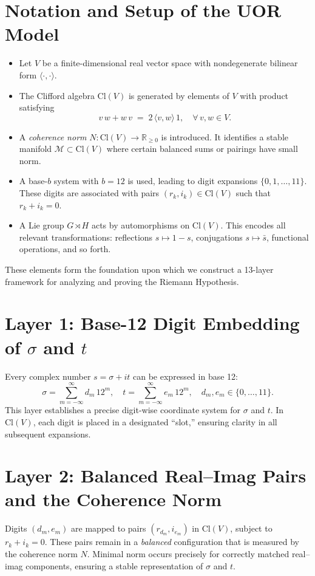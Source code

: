 \documentclass[11pt]{article}
\begin{document}
\section{Notation and Setup of the UOR Model}
\label{sec:notation-setup}
\begin{itemize}
\item Let \(V\) be a finite-dimensional real vector space with nondegenerate bilinear form \(\langle\cdot,\cdot\rangle\).  
\item The Clifford algebra \(\mathrm{Cl}(V)\) is generated by elements of \(V\) with product satisfying 
\[
  v\,w + w\,v \;=\; 2\,\langle v,w\rangle \,1, \quad \forall\,v,w\in V.
\]
\item A \emph{coherence norm} \(N\colon \mathrm{Cl}(V)\to \mathbb{R}_{\ge0}\) is introduced. It identifies a stable manifold \(\mathcal{M}\subset \mathrm{Cl}(V)\) where certain balanced sums or pairings have small norm.
\item A base-\(b\) system with \(b=12\) is used, leading to digit expansions \(\{0,1,\dots,11\}\). These digits are associated with pairs \((r_k, i_k)\in \mathrm{Cl}(V)\) such that \(r_k + i_k=0\). 
\item A Lie group \(G\rtimes H\) acts by automorphisms on \(\mathrm{Cl}(V)\). This encodes all relevant transformations: reflections \(s\mapsto 1-s\), conjugations \(s\mapsto \bar{s}\), functional operations, and so forth.  
\end{itemize}

These elements form the foundation upon which we construct a 13-layer framework for analyzing and proving the Riemann Hypothesis.

\section{Layer 1: Base-12 Digit Embedding of \(\sigma\) and \(t\)}
Every complex number \(s=\sigma+it\) can be expressed in base 12:
\[
  \sigma = \sum_{m=-\infty}^{\infty} d_m \, 12^m, 
  \quad
  t = \sum_{m=-\infty}^{\infty} e_m \, 12^m,
  \quad
  d_m,e_m \in \{0,\dots,11\}.
\]
This layer establishes a precise digit-wise coordinate system for \(\sigma\) and \(t\). In \(\mathrm{Cl}(V)\), each digit is placed in a designated “slot,” ensuring clarity in all subsequent expansions.

\section{Layer 2: Balanced Real--Imag Pairs and the Coherence Norm}
Digits \((d_m, e_m)\) are mapped to pairs \((r_{d_m}, i_{e_m})\) in \(\mathrm{Cl}(V)\), subject to \(r_k + i_k = 0\). These pairs remain in a \emph{balanced} configuration that is measured by the coherence norm \(N\). Minimal norm occurs precisely for correctly matched real--imag components, ensuring a stable representation of \(\sigma\) and \(t\).
\end{document}

